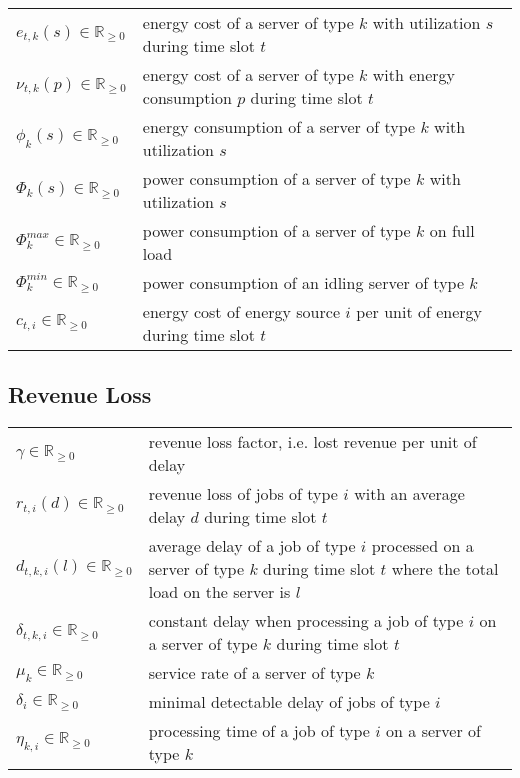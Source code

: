 \begin{tabularx}{\textwidth}{p{100pt}X}
    $e_{t,k}(s) \in \mathbb{R}_{\geq 0}$ & energy cost of a server of type $k$ with utilization $s$ during time slot $t$ \\
    $\nu_{t,k}(p) \in \mathbb{R}_{\geq 0}$ & energy cost of a server of type $k$ with energy consumption $p$ during time slot $t$ \\
    $\phi_k(s) \in \mathbb{R}_{\geq 0}$ & energy consumption of a server of type $k$ with utilization $s$ \\
    $\Phi_k(s) \in \mathbb{R}_{\geq 0}$ & power consumption of a server of type $k$ with utilization $s$ \\
    $\Phi_k^{max} \in \mathbb{R}_{\geq 0}$ & power consumption of a server of type $k$ on full load \\
    $\Phi_k^{min} \in \mathbb{R}_{\geq 0}$ & power consumption of an idling server of type $k$ \\
    $c_{t,i} \in \mathbb{R}_{\geq 0}$ & energy cost of energy source $i$ per unit of energy during time slot $t$ \\
\end{tabularx}

\subsection*{Revenue Loss}

\begin{tabularx}{\textwidth}{p{100pt}X}
    $\gamma \in \mathbb{R}_{\geq 0}$ & revenue loss factor, i.e. lost revenue per unit of delay \\
    $r_{t,i}(d) \in \mathbb{R}_{\geq 0}$ & revenue loss of jobs of type $i$ with an average delay $d$ during time slot $t$ \\
    $d_{t,k,i}(l) \in \mathbb{R}_{\geq 0}$ & average delay of a job of type $i$ processed on a server of type $k$ during time slot $t$ where the total load on the server is $l$ \\
    $\delta_{t,k,i} \in \mathbb{R}_{\geq 0}$ & constant delay when processing a job of type $i$ on a server of type $k$ during time slot $t$ \\
    $\mu_k \in \mathbb{R}_{\geq 0}$ & service rate of a server of type $k$ \\
    $\delta_i \in \mathbb{R}_{\geq 0}$ & minimal detectable delay of jobs of type $i$ \\
    $\eta_{k,i} \in \mathbb{R}_{\geq 0}$ & processing time of a job of type $i$ on a server of type $k$ \\
\end{tabularx}


